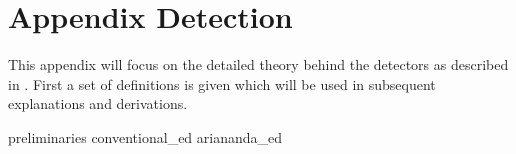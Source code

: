 \documentclass[a4paper, openany, oneside]{memoir}
\begin{document}
\section{Appendix Detection}\label{app:detector}
This appendix will focus on the detailed theory behind the detectors as described in . First a set of definitions is given which will be
used in subsequent explanations and derivations.

{preliminaries}
{conventional_ed}
{ariananda_ed}
\end{document}
